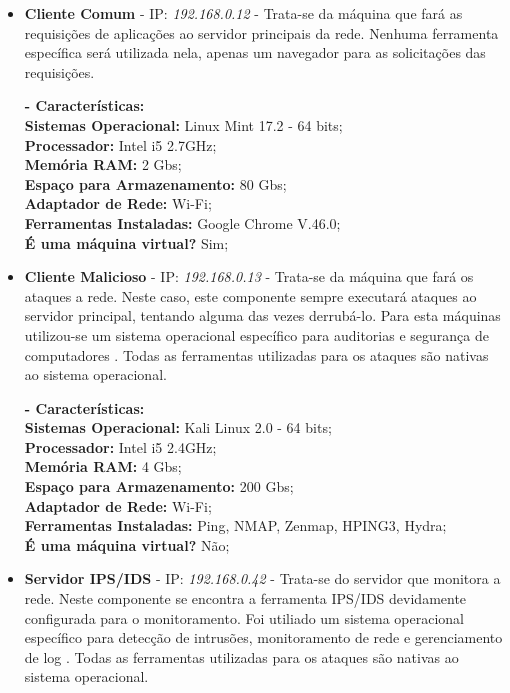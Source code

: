 		\begin{itemize}
			\item \textbf{Cliente Comum} - IP: \emph{192.168.0.12} - Trata-se da máquina que fará as requisições de aplicações ao servidor principais da rede. Nenhuma ferramenta específica será utilizada nela, apenas um navegador para as solicitações das requisições.

			\textbf{- Características:} \\
			\textbf{Sistemas Operacional:} Linux Mint 17.2 - 64 bits; \\
			\textbf{Processador:} Intel i5 2.7GHz; \\
			\textbf{Memória RAM:} 2 Gbs; \\
			\textbf{Espaço para Armazenamento:} 80 Gbs; \\
			\textbf{Adaptador de Rede:} Wi-Fi; \\
			\textbf{Ferramentas Instaladas:} Google Chrome V.46.0; \\
			\textbf{É uma máquina virtual?} Sim; \\

			\item \textbf{Cliente Malicioso} - IP: \emph{192.168.0.13} - Trata-se da máquina que fará os ataques a rede. Neste caso, este componente sempre executará ataques ao servidor principal, tentando alguma das vezes derrubá-lo. Para esta máquinas utilizou-se um sistema operacional específico para auditorias e segurança de computadores \cite{kali}. Todas as ferramentas utilizadas para os ataques são nativas ao sistema operacional.

			\textbf{- Características:} \\
			\textbf{Sistemas Operacional:} Kali Linux 2.0 - 64 bits; \\
			\textbf{Processador:} Intel i5 2.4GHz; \\
			\textbf{Memória RAM:} 4 Gbs; \\
			\textbf{Espaço para Armazenamento:} 200 Gbs; \\
			\textbf{Adaptador de Rede:} Wi-Fi; \\
			\textbf{Ferramentas Instaladas:} Ping, NMAP, Zenmap, HPING3, Hydra; \\
			\textbf{É uma máquina virtual?} Não; \\

			\item \textbf{Servidor IPS/IDS} - IP: \emph{192.168.0.42} - Trata-se do servidor que monitora a rede. Neste componente se encontra a ferramenta IPS/IDS devidamente configurada para o monitoramento. Foi utiliado um sistema operacional específico para detecção de intrusões, monitoramento de rede e gerenciamento de log \cite{SO}. Todas as ferramentas utilizadas para os ataques são nativas ao sistema operacional.


\end{itemize}
